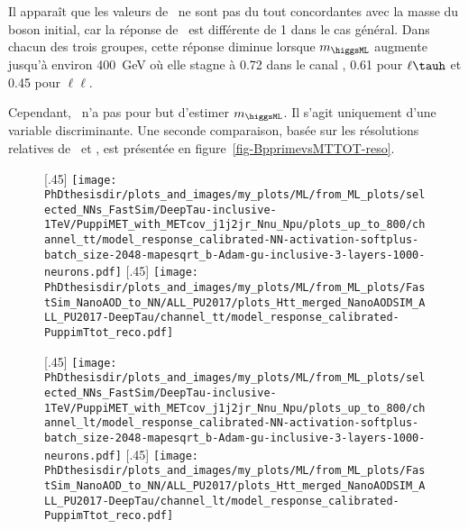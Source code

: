 Il apparaît que les valeurs de \mTtot\ ne sont pas du tout concordantes avec la masse du boson initial, car la réponse de \mTtot\ est différente de 1 dans le cas général.
Dans chacun des trois groupes,
cette réponse diminue lorsque $m_{\higgsML}$ augmente jusqu'à environ \SI{400}{\GeV} où elle stagne
à \num{0.72} dans le canal \tauh\tauh,
\num{0.61} pour $\ell\tauh$
et
\num{0.45} pour $\ell\ell$.
\par
Cependant, \mTtot\ n'a pas pour but d'estimer $m_{\higgsML}$.
Il s'agit uniquement d'une variable discriminante.
Une seconde comparaison, basée sur les résolutions relatives de \mml\ et \mTtot, est présentée en figure~\ref{fig-BpprimevsMTTOT-reso}.
\begin{figure}[p]
\centering

[.45\textwidth]
{\texttt{[image: \\PhDthesisdir/plots\_and\_images/my\_plots/ML/from\_ML\_plots/selected\_NNs\_FastSim/DeepTau-inclusive-1TeV/PuppiMET\_with\_METcov\_j1j2jr\_Nnu\_Npu/plots\_up\_to\_800/channel\_tt/model\_response\_calibrated-NN-activation-softplus-batch\_size-2048-mapesqrt\_b-Adam-gu-inclusive-3-layers-1000-neurons.pdf]}\vspace{-.5\baselineskip}}
\hfill
{}[.45\textwidth]
{\texttt{[image: \\PhDthesisdir/plots\_and\_images/my\_plots/ML/from\_ML\_plots/FastSim\_NanoAOD\_to\_NN/ALL\_PU2017/plots\_Htt\_merged\_NanoAODSIM\_ALL\_PU2017-DeepTau/channel\_tt/model\_response\_calibrated-PuppimTtot\_reco.pdf]}\vspace{-.5\baselineskip}}

[.45\textwidth]
{\texttt{[image: \\PhDthesisdir/plots\_and\_images/my\_plots/ML/from\_ML\_plots/selected\_NNs\_FastSim/DeepTau-inclusive-1TeV/PuppiMET\_with\_METcov\_j1j2jr\_Nnu\_Npu/plots\_up\_to\_800/channel\_lt/model\_response\_calibrated-NN-activation-softplus-batch\_size-2048-mapesqrt\_b-Adam-gu-inclusive-3-layers-1000-neurons.pdf]}\vspace{-.5\baselineskip}}
\hfill
{}[.45\textwidth]
{\texttt{[image: \\PhDthesisdir/plots\_and\_images/my\_plots/ML/from\_ML\_plots/FastSim\_NanoAOD\_to\_NN/ALL\_PU2017/plots\_Htt\_merged\_NanoAODSIM\_ALL\_PU2017-DeepTau/channel\_lt/model\_response\_calibrated-PuppimTtot\_reco.pdf]}\vspace{-.5\baselineskip}}


\end{figure}
